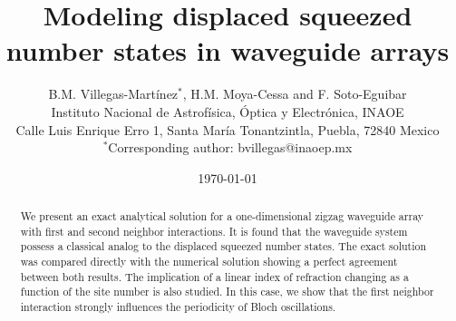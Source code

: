 \documentclass[12pt]{article}
\numberwithin{equation}{section}
\begin{document}
\title{Modeling displaced squeezed number states in waveguide arrays}

\author{B.M. Villegas-Martínez$^*$, H.M. Moya-Cessa and F. Soto-Eguibar\\
\small Instituto Nacional de Astrofísica, Óptica y Electrónica, INAOE \\
\small {Calle Luis Enrique Erro 1, Santa María Tonantzintla, Puebla, 72840 Mexico}\\
$^*$\small {Corresponding author: bvillegas@inaoep.mx}}

\date{\today}

\maketitle

\begin{abstract}
We present an exact analytical solution for a one-dimensional zigzag waveguide array with first and second neighbor interactions. It is found that the waveguide system possess a classical analog to the displaced squeezed number states. The exact solution was compared directly with the numerical solution showing a perfect agreement between both results. The implication of a linear index of refraction changing as a function of the site number is also studied. In this case, we show that the first neighbor interaction strongly influences the periodicity of Bloch oscillations.
\end{abstract}
\end{document}
